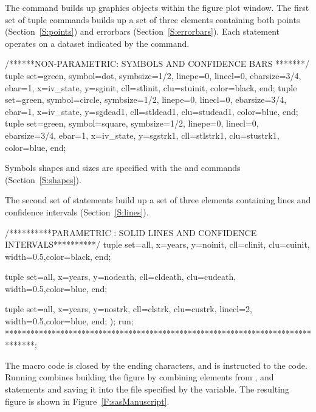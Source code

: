 \documentclass[nojss]{jss}\usepackage[]{graphicx}\usepackage[]{color}
\begin{document}
The  command builds up graphics objects within the figure plot window. The first set of tuple commands builds up a set of three elements containing both points (Section~\ref{S:points}) and errorbars (Section~\ref{S:errorbars}). Each  statement operates on a dataset indicated by the  command. 
\begin{CodeChunk}\small
\begin{CodeInput}
/******NON-PARAMETRIC: SYMBOLS AND CONFIDENCE BARS *******/
tuple set=green, symbol=dot, symbsize=1/2, linepe=0, linecl=0,
      ebarsize=3/4, ebar=1,
      x=iv_state, y=sginit, cll=stlinit, clu=stuinit, color=black, 
      end;
tuple set=green, symbol=circle, symbsize=1/2, linepe=0, linecl=0,
      ebarsize=3/4, ebar=1,
      x=iv_state, y=sgdead1, cll=stldead1, clu=studead1, color=blue, 
      end;
tuple set=green, symbol=square, symbsize=1/2, linepe=0, linecl=0,
      ebarsize=3/4, ebar=1,
      x=iv_state, y=sgstrk1, cll=stlstrk1, clu=stustrk1, color=blue, 
      end;
\end{CodeInput}
\end{CodeChunk}
Symbols shapes and sizes are specified with the  and  commands (Section~\ref{S:shapes}).

The second set of  statements build up a set of three elements containing lines and confidence intervals (Section~\ref{S:lines}).
\begin{CodeChunk}\small
\begin{CodeInput}

/**********PARAMETRIC : SOLID LINES AND CONFIDENCE INTERVALS**********/      
tuple set=all, x=years, y=noinit, cll=clinit, clu=cuinit,
      width=0.5,color=black, 
      end;

tuple set=all, x=years, y=nodeath, cll=cldeath, clu=cudeath,
      width=0.5,color=blue, 
      end;

tuple set=all, x=years, y=nostrk, cll=clstrk, clu=custrk,
      linecl=2, width=0.5,color=blue, 
      end;
);
run;
*******************************************************************************;
\end{CodeInput}
\end{CodeChunk}

The  macro code is closed by the ending \code{);} characters, and  is instructed to  the code. Running combines building the figure by combining elements from ,  and  statements and saving it into the file specified by the  variable. The resulting figure is shown in Figure~\ref{F:sasManuscript}.
\end{document}
